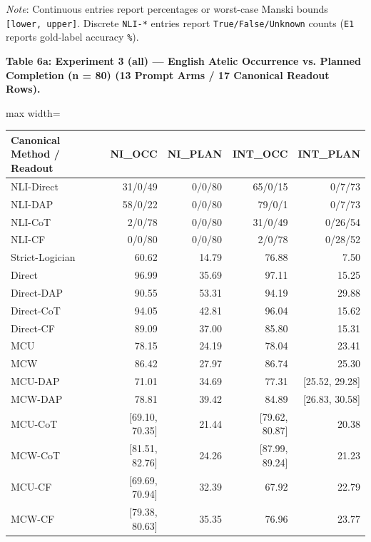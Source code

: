 \documentclass[11pt,a4paper]{article}
\begin{document}
\textit{Note}: Continuous entries report percentages or worst-case Manski bounds \texttt{[lower, upper]}. Discrete \texttt{NLI-\allowbreak{}*} entries report \texttt{True/\allowbreak{}False/\allowbreak{}Unknown} counts (\texttt{E1} reports gold-label accuracy \texttt{\%}).



\textbf{Table 6a: Experiment 3 (all) --- English Atelic Occurrence vs. Planned Completion (n = 80) (13 Prompt Arms / 17 Canonical Readout Rows).}

\begin{center}\begingroup\small\setlength{\tabcolsep}{4.5pt}\renewcommand{\arraystretch}{1.12}\begin{adjustbox}{max width=\textwidth}\begin{tabular}{lrrrr}\toprule
\textbf{Canonical Method / Readout} & \textbf{NI\_\allowbreak{}OCC} & \textbf{NI\_\allowbreak{}PLAN} & \textbf{INT\_\allowbreak{}OCC} & \textbf{INT\_\allowbreak{}PLAN} \\ \midrule
NLI-Direct & 31/0/49 & 0/0/80 & 65/0/15 & 0/7/73 \\
NLI-DAP & 58/0/22 & 0/0/80 & 79/0/1 & 0/7/73 \\
NLI-CoT & 2/0/78 & 0/0/80 & 31/0/49 & 0/26/54 \\
NLI-CF & 0/0/80 & 0/0/80 & 2/0/78 & 0/28/52 \\
Strict-Logician & 60.62 & 14.79 & 76.88 & 7.50 \\
Direct & 96.99 & 35.69 & 97.11 & 15.25 \\
Direct-DAP & 90.55 & 53.31 & 94.19 & 29.88 \\
Direct-CoT & 94.05 & 42.81 & 96.04 & 15.62 \\
Direct-CF & 89.09 & 37.00 & 85.80 & 15.31 \\
MCU & 78.15 & 24.19 & 78.04 & 23.41 \\
MCW & 86.42 & 27.97 & 86.74 & 25.30 \\
MCU-DAP & 71.01 & 34.69 & 77.31 & [25.52, 29.28] \\
MCW-DAP & 78.81 & 39.42 & 84.89 & [26.83, 30.58] \\
MCU-CoT & [69.10, 70.35] & 21.44 & [79.62, 80.87] & 20.38 \\
MCW-CoT & [81.51, 82.76] & 24.26 & [87.99, 89.24] & 21.23 \\
MCU-CF & [69.69, 70.94] & 32.39 & 67.92 & 22.79 \\
MCW-CF & [79.38, 80.63] & 35.35 & 76.96 & 23.77 \\
\bottomrule\end{tabular}\end{adjustbox}\endgroup\end{center}
\end{document}
